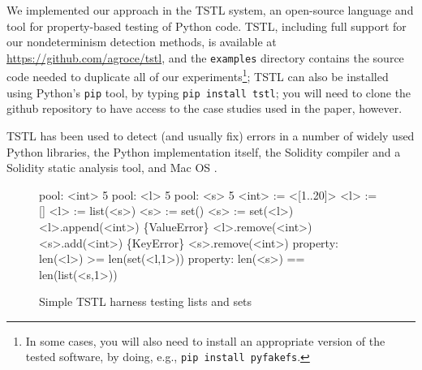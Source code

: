 We implemented our approach in the TSTL \cite{NFM15,ISSTA15,tstlsttt}
system, an open-source
language and tool for property-based testing
\cite{Hypothesis,ClaessenH00} of Python code.   TSTL, including full
support for our nondeterminism detection methods, is available at
\url{https://github.com/agroce/tstl}, and the {\tt examples} directory
contains the source code needed to duplicate all of our
experiments\footnote{In some cases, you will also need to install an
  appropriate version of the tested software, by doing, e.g., {\tt pip
    install pyfakefs}.};
TSTL can also be installed using Python's {\tt pip} tool, by typing
{\tt pip install tstl}; you will need to clone the github repository
to have access to the case studies used in the paper, however.

TSTL has
been used to detect (and usually fix) errors in a number of widely
used Python libraries, the Python implementation itself, the Solidity
compiler and a Solidity static analysis tool, and Mac OS \cite{tstl}.

\begin{figure}
\begin{code}
pool: <int> 5
pool: <l> 5
pool: <s> 5
\vspace{0.1in}
<int> := <[1..20]>
<l> := []
<l> := list(<s>)
<s> := set()
<s> := set(<l>)
\vspace{0.1in}
<l>.append(<int>)
\{ValueError\} <l>.remove(<int>)
<s>.add(<int>)
\{KeyError\} <s>.remove(<int>)
\vspace{0.1in}
property: len(<l>) >= len(set(<l,1>))
property: len(<s>) == len(list(<s,1>))
\end{code}
\caption{Simple TSTL harness testing lists and sets}
\label{fig:simple}
\end{figure}

